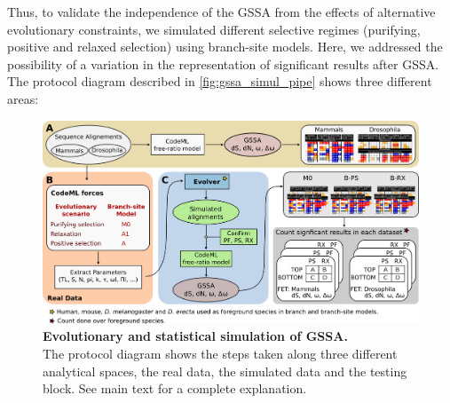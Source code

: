 Thus, to validate the independence of the GSSA from the effects of alternative evolutionary constraints, we simulated different selective regimes (purifying, positive and relaxed selection) using branch-site models. Here, we addressed the possibility of a variation in the representation of significant results after GSSA. The protocol diagram described in \autoref{fig:gssa_simul_pipe} shows three different areas:
\begin{figure}[H]
\centering 
\includegraphics[width=\textwidth]{figures/material_methods/simulations_met.png}
\caption[Evolutionary and statistical simulation of GSSA]{
  {\bf Evolutionary and statistical simulation of GSSA.}\\
  The protocol diagram shows the steps taken along three different analytical spaces, the real data, the simulated data and the testing block. See main text for a complete explanation.}
\label{fig:gssa_simul_pipe}
\end{figure}
